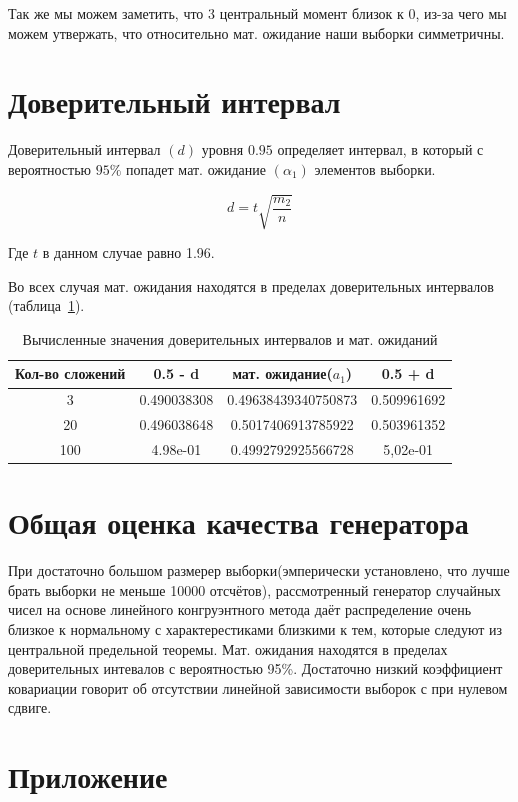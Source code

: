 \documentclass[a4paper,12pt]{article}
\begin{document}
Так же мы можем заметить, что 3 центральный момент близок к $0$, из-за чего мы можем утвержать, что относительно мат. ожидание наши выборки симметричны.

\newpage\section{Доверительный интервал}
Доверительный интервал $(d)$ уровня $0.95$ определяет интервал, в который с вероятностью $95\%$ попадет мат. ожидание $(\alpha_1)$ элементов выборки.

{\large $$d=t\sqrt{\frac{m_2}{n}}$$}

Где $t$ в данном случае равно 1.96.

Во всех случая мат. ожидания находятся в пределах доверительных интервалов (таблица~\ref{table:d}).

\begin{table}[h]
	\caption{Вычисленные значения доверительных интервалов и мат. ожиданий}
	\begin{tabular}{|c|c|c|c|}
	\hline 
	Кол-во сложений & 0.5 - d & мат. ожидание($a_1$) & 0.5 + d \\ 
	\hline 
	3 & 0.490038308 & 0.49638439340750873 & 0.509961692 \\ 
	\hline 
	20 & 0.496038648 & 0.5017406913785922 & 0.503961352 \\ 
	\hline
	100 & 4.98e-01 & 0.4992792925566728 & 5,02e-01 \\ 
	\hline 
	\end{tabular}
	\label{table:d} 
\end{table}

\newpage\section{Общая оценка качества генератора}
При достаточно большом размерер выборки(эмперически установлено, что лучше брать выборки не меньше 10000 отсчётов), рассмотренный генератор случайных чисел на основе линейного конгруэнтного метода даёт распределение очень близкое к нормальному с характерестиками близкими к тем, которые следуют из центральной предельной теоремы. Мат. ожидания находятся в пределах доверительных интевалов с вероятностью 95\%. Достаточно низкий коэффициент ковариации говорит об отсутствии  линейной зависимости выборок с при нулевом сдвиге.

\newpage\section{Приложение}
\end{document}
